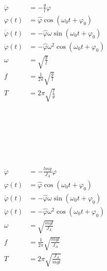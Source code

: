 \begin{boxleft}
\\
\\
\\
\\
\end{boxleft}\begin{boxrightshaded}
\begin{align}
\ddot{\varphi}&=-\frac{g}{l}\varphi\\
\varphi(t)&=\hat{\varphi}\cos(\omega_0 t+\varphi_0)\\
\dot{\varphi}(t)&=-\hat{\varphi}\omega\sin(\omega_0 t+\varphi_0)\\
\ddot{\varphi}(t)&=-\hat{\varphi}\omega^2\cos(\omega_0 t+\varphi_0)\\
\omega&=\sqrt{\frac{g}{l}}\\
f&=\frac{1}{2\pi}\sqrt{\frac{g}{l}}\\
T&=2\pi\sqrt{\frac{l}{g}}
\end{align}
\end{boxrightshaded}

\begin{boxleft}
\\
\\
\\
\\
\\
\end{boxleft}\begin{boxrightshaded}
\begin{align}
\ddot{\varphi}&=-\frac{lmg}{J_A}\varphi\\
\varphi(t)&=\hat{\varphi}\cos(\omega_0 t+\varphi_0)\\
\dot{\varphi}(t)&=-\hat{\varphi}\omega\sin(\omega_0 t+\varphi_0)\\
\ddot{\varphi}(t)&=-\hat{\varphi}\omega^2\cos(\omega_0 t+\varphi_0)\\
\omega&=\sqrt{\frac{mgl}{J_A}}\\
f&=\frac{1}{2\pi}\sqrt{\frac{mgl}{J_A}}\\
T&=2\pi\sqrt{\frac{J_A}{mgl}}
\end{align}
\end{boxrightshaded}

